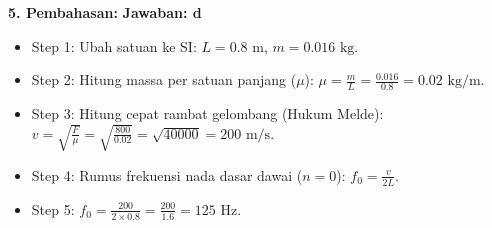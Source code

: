 \documentclass[12pt,a4paper]{article}
\begin{document}
\textbf{5. Pembahasan:} \hfill \textbf{Jawaban: d}
\begin{itemize}
    \item Step 1: Ubah satuan ke SI: $L = 0.8 \text{ m}$, $m = 0.016 \text{ kg}$.
    \item Step 2: Hitung massa per satuan panjang ($\mu$): $\mu = \frac{m}{L} = \frac{0.016}{0.8} = 0.02 \text{ kg/m}$.
    \item Step 3: Hitung cepat rambat gelombang (Hukum Melde): $v = \sqrt{\frac{F}{\mu}} = \sqrt{\frac{800}{0.02}} = \sqrt{40000} = 200 \text{ m/s}$.
    \item Step 4: Rumus frekuensi nada dasar dawai ($n=0$): $f_0 = \frac{v}{2L}$.
    \item Step 5: $f_0 = \frac{200}{2 \times 0.8} = \frac{200}{1.6} = 125 \text{ Hz}$.
\end{itemize}
\end{document}
